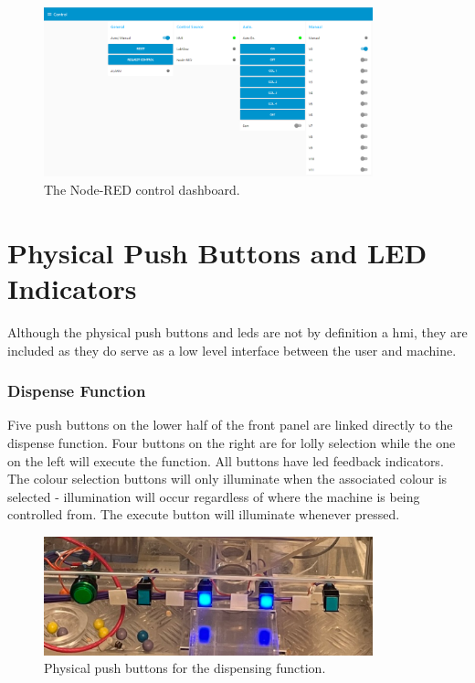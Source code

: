        \begin{figure}[H]
            \centering
            \includegraphics[width = 0.85\textwidth]{2_images/nodeRedControl}
            \caption{The Node-RED control dashboard.}
            \label{fig:nodeRedWatchDogFlow}
        \end{figure}  
        
\section{Physical Push Buttons and LED Indicators}
    Although the physical push buttons and \acrshort{led}s are not by definition a \acrshort{hmi}, they are included as they do serve as a low level interface between the user and machine.

    \subsubsection{Dispense Function}
        Five push buttons on the lower half of the front panel are linked directly to the dispense function. Four buttons on the right are for lolly selection while the one on the left will execute the function. All buttons have \acrshort{led} feedback indicators. The colour selection buttons will only illuminate when the associated colour is selected - illumination will occur regardless of where the machine is being controlled from. The execute button will illuminate whenever pressed.

        \begin{figure}[H]
            \centering
            \includegraphics[width = 0.85\textwidth]{2_images/physicalPushButtons}
            \caption{Physical push buttons for the dispensing function.}
            \label{fig:physicalPushButtons}
        \end{figure}          

